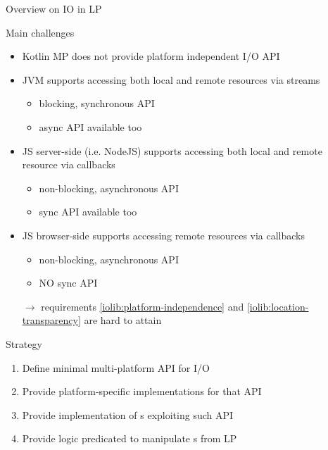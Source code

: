 \documentclass[handout]{beamer}
\begin{document}
\begin{frame}[allowframebreaks]{Overview on IO in LP}
    \begin{alertblock}{Main challenges}
        \begin{itemize}
            \item Kotlin MP does not provide platform independent I/O API
            \item JVM supports accessing both local and remote resources via \alert{streams}
            \begin{itemize}
                \item blocking, synchronous API
                \item async API available too
            \end{itemize}
            \item JS server-side (i.e. NodeJS) supports accessing both local and remote resource via \alert{callbacks}
            \begin{itemize}
                \item non-blocking, asynchronous API
                \item sync API available too
            \end{itemize}
            \item JS browser-side supports accessing remote resources via \alert{callbacks}
            \begin{itemize}
                \item non-blocking, asynchronous API
                \item NO sync API
            \end{itemize}
            \item[$\rightarrow$] requirements \ref{iolib:platform-independence} and \ref{iolib:location-transparency} are hard to attain
        \end{itemize}
    \end{alertblock}

    \framebreak

    \begin{exampleblock}{Strategy}
        \begin{enumerate}
            \item Define minimal multi-platform API for I/O
            \item Provide platform-specific implementations for that API
            \item Provide implementation of s exploiting such API
            \item Provide logic predicated to manipulate s from LP
        \end{enumerate}
    \end{exampleblock}


\end{frame}
\end{document}
